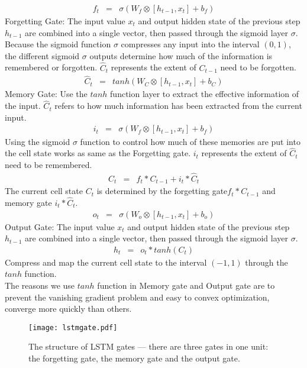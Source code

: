 \documentclass{ecai}
\begin{document}
\begin{eqnarray}
f_t & = & \sigma(W_f\otimes[h_{t-1},x_t]+b_f) 
\end{eqnarray}
Forgetting Gate: The input value $x_t$ and output hidden state of the previous step $h_{t-1}$ are combined into a single vector, then passed through the sigmoid layer $\sigma$. Because the sigmoid function $\sigma$ compresses any input into the interval $(0,1)$, the different sigmoid $\sigma$ outputs determine how much of the information is remembered or forgotten. $\hat{C}_t$ represents the extent of $C_{t-1}$ need to be forgotten.
\begin{eqnarray}
\hat{C}_t & = &  tanh(W_C\otimes[h_{t-1},x_t]+b_C) 
\end{eqnarray}
Memory Gate: Use the $tanh$ function layer to extract the effective information of the input. $\hat{C}_t$ refers to how much information has been extracted from the current input.
\begin{eqnarray}
i_t & = & \sigma(W_f\otimes[h_{t-1},x_t]+b_f) 
\end{eqnarray}
Using the sigmoid $\sigma$ function to control how much of these memories are put into the cell state works as same as the Forgetting gate. $i_t$ represents the extent of  $\hat{C}_t$ need to be remembered. 
\begin{eqnarray}
C_t & = & f_t * C_{t-1}+i_t * \hat{C}_t 
\end{eqnarray}
The current cell state $C_t$ is determined by the forgetting gate$f_t * C_{t-1}$ and memory gate $i_t * \hat{C}_t$.
\begin{eqnarray}
o_t & = &\sigma(W_o\otimes[h_{t-1},x_t]+b_o) 
\end{eqnarray}
Output Gate: The input value $x_t$ and output hidden state of the previous step $h_{t-1}$ are combined into a single vector, then passed through the sigmoid layer $\sigma$.
\begin{eqnarray}
h_t & = & o_t * tanh(C_t) 
\end{eqnarray}
Compress and map the current cell state to the interval $(-1, 1)$ through the $tanh$ function.\\

The reasons we use $tanh$ function in Memory gate and Output gate are to prevent the vanishing gradient problem and easy to convex optimization, converge more quickly than others.







\begin{figure}[h]
    \centering
    \texttt{[image: lstmgate.pdf]}
    \caption{The structure of LSTM gates --- there are three gates in one unit: the forgetting gate, the memory gate and the output gate.}
    \label{fig:network}
\end{figure}
\end{document}
